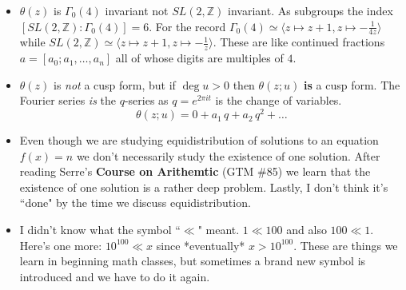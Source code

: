 \documentclass[12pt]{article}
\begin{document}
\begin{itemize}
\item $\theta(z)$ is $\Gamma_0(4)$ invariant not $SL(2, \mathbb{Z})$ invariant.   As subgroups the index $[SL(2, \mathbb{Z}): \Gamma_0(4)] = 6 $.  For the record $\Gamma_0(4) \simeq \langle z \mapsto z + 1, z \mapsto - \frac{1}{4z}\rangle$ while $SL(2, \mathbb{Z}) \simeq \langle z \mapsto z + 1, z \mapsto - \frac{1}{z}\rangle$.  These are like continued fractions $a = [ a_0; a_1, \dots, a_n] $ all of whose digits are multiples of $4$.
\item $\theta(z)$ is \textit{not} a cusp form, but if $\deg u > 0$ then $\theta(z;u)$ \textbf{is} a cusp form.  The Fourier series \textit{is} the $q$-series as $q = e^{2\pi i t}$ is the change of variables.
$$ \theta(z; u) = 0 + a_1 \, q + a_2 \, q^2 + \dots $$
\item Even though we are studying equidistribution of solutions to an equation $f(x) = n$ we don't necessarily study the existence of {\color{green} one} solution. After reading Serre's \textbf{Course on Arithemtic} (GTM \#85) we learn that the existence of one solution is a rather deep problem.  Lastly, I don't think it's ``done" by the time we discuss equidistribution. 
\item I didn't know what the symbol ``$\ll$" meant.  $1 \ll 100$ and also $100 \ll 1$.  Here's one more: $10^{100} \ll x$ since *eventually* $x > 10^{100}$.  These are things we learn in beginning math classes, but sometimes a brand new symbol is introduced and we have to do it again.
\end{itemize}

\newpage
\end{document}
